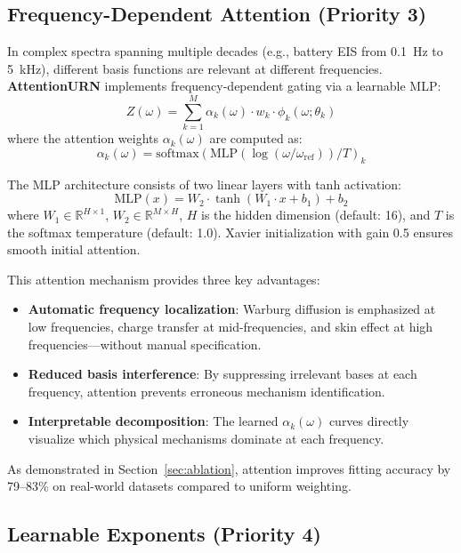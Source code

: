 \documentclass{ieeeaccess}
\begin{document}
\subsection{Frequency-Dependent Attention (Priority 3)}
\label{sec:attention}

In complex spectra spanning multiple decades (e.g., battery EIS from 0.1~Hz to 5~kHz), different basis functions are relevant at different frequencies. \textbf{AttentionURN} implements frequency-dependent gating via a learnable MLP:
\begin{equation}
Z(\omega) = \sum_{k=1}^{M} \alpha_k(\omega) \cdot w_k \cdot \phi_k(\omega; \theta_k)
\end{equation}
where the attention weights $\alpha_k(\omega)$ are computed as:
\begin{equation}
\alpha_k(\omega) = \text{softmax}\left( \text{MLP}(\log(\omega/\omega_{\text{ref}})) / T \right)_k
\label{eq:attention}
\end{equation}

The MLP architecture consists of two linear layers with tanh activation:
\begin{equation}
\text{MLP}(x) = W_2 \cdot \tanh(W_1 \cdot x + b_1) + b_2
\end{equation}
where $W_1 \in \mathbb{R}^{H \times 1}$, $W_2 \in \mathbb{R}^{M \times H}$, $H$ is the hidden dimension (default: 16), and $T$ is the softmax temperature (default: 1.0). Xavier initialization with gain 0.5 ensures smooth initial attention.

This attention mechanism provides three key advantages:
\begin{itemize}
\item \textbf{Automatic frequency localization}: Warburg diffusion is emphasized at low frequencies, charge transfer at mid-frequencies, and skin effect at high frequencies---without manual specification.
\item \textbf{Reduced basis interference}: By suppressing irrelevant bases at each frequency, attention prevents erroneous mechanism identification.
\item \textbf{Interpretable decomposition}: The learned $\alpha_k(\omega)$ curves directly visualize which physical mechanisms dominate at each frequency.
\end{itemize}

As demonstrated in Section~\ref{sec:ablation}, attention improves fitting accuracy by 79--83\% on real-world datasets compared to uniform weighting.

\subsection{Learnable Exponents (Priority 4)}
\label{sec:learnable_exp}
\end{document}
